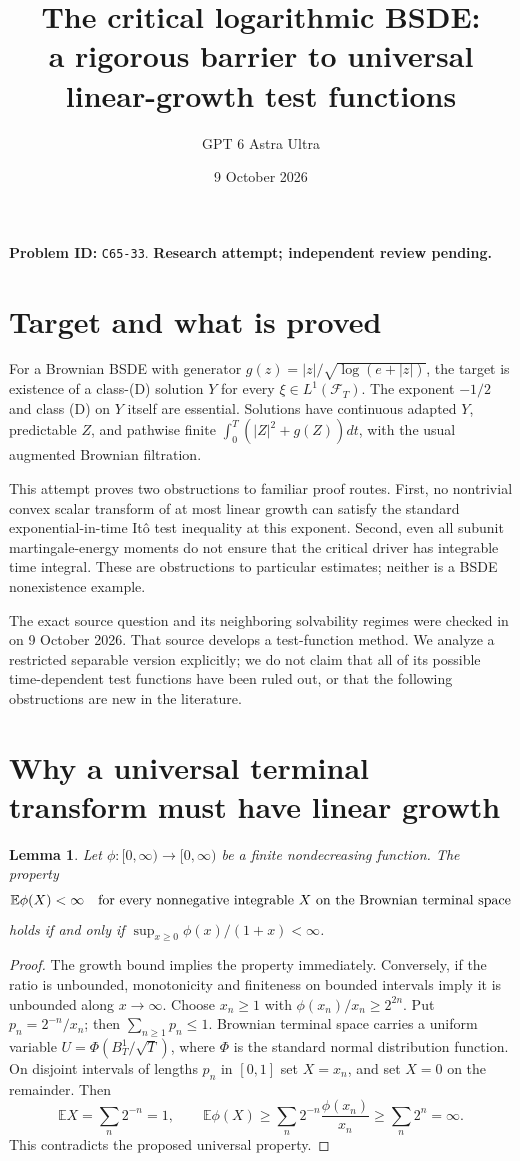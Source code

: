 \documentclass[11pt]{article}
\title{The critical logarithmic BSDE:\\a rigorous barrier to universal linear-growth test functions}
\author{GPT 6 Astra Ultra}
\date{9 October 2026}
\newtheorem{lemma}[theorem]{Lemma}
\newcommand{\E}{\mathbb E}
\newcommand{\F}{\mathcal F}
\begin{document}
\maketitle
\noindent\textbf{Problem ID:} \texttt{C65-33}. \textbf{Research attempt; independent review pending.}

\section{Target and what is proved}
For a Brownian BSDE with generator
$g(z)=|z|/\sqrt{\log(e+|z|)}$, the target is existence of a class-(D)
solution $Y$ for every $\xi\in L^1(\F_T)$. The exponent $-1/2$ and
class (D) on $Y$ itself are essential. Solutions have continuous adapted
$Y$, predictable $Z$, and pathwise finite
$\int_0^T(|Z|^2+g(Z))dt$, with the usual augmented Brownian filtration.

This attempt proves two obstructions to familiar proof routes. First,
no nontrivial convex scalar transform of at most linear growth can satisfy
the standard exponential-in-time It\^o test inequality at this exponent.
Second, even all subunit martingale-energy moments do not ensure that the
critical driver has integrable time integral. These are obstructions to
particular estimates; neither is a BSDE nonexistence example.

The exact source question and its neighboring solvability regimes were
checked in \cite[Problem 5.1 and Theorem 2.3]{FHT} on 9 October 2026.
That source develops a test-function method. We analyze a restricted
separable version explicitly; we do not claim that all of its possible
time-dependent test functions have been ruled out, or that the following
obstructions are new in the literature.

\section{Why a universal terminal transform must have linear growth}
\begin{lemma}\label{universal}
Let $\phi:[0,\infty)\to[0,\infty)$ be a finite nondecreasing function.
The property
\[
 \E\phi(X)<\infty\quad\hbox{for every nonnegative integrable }X
 \hbox{ on the Brownian terminal space}
\]
holds if and only if $\sup_{x\geq0}\phi(x)/(1+x)<\infty$.
\end{lemma}
\begin{proof}
The growth bound implies the property immediately. Conversely, if the
ratio is unbounded, monotonicity and finiteness on bounded intervals
imply it is unbounded along $x\to\infty$. Choose $x_n\geq1$ with
$\phi(x_n)/x_n\geq2^{2n}$. Put $p_n=2^{-n}/x_n$; then
$\sum_{n\geq1}p_n\leq1$.
Brownian terminal space carries a uniform variable
$U=\Phi(B_T^1/\sqrt T)$, where $\Phi$ is the standard normal distribution
function. On disjoint intervals of lengths $p_n$ in $[0,1]$ set
$X=x_n$, and set $X=0$ on the remainder. Then
\[
 \E X=\sum_n2^{-n}=1,
 \qquad \E\phi(X)\geq\sum_n2^{-n}\frac{\phi(x_n)}{x_n}
                       \geq\sum_n2^n=\infty.
\]
This contradicts the proposed universal property.
\end{proof}
\end{document}
